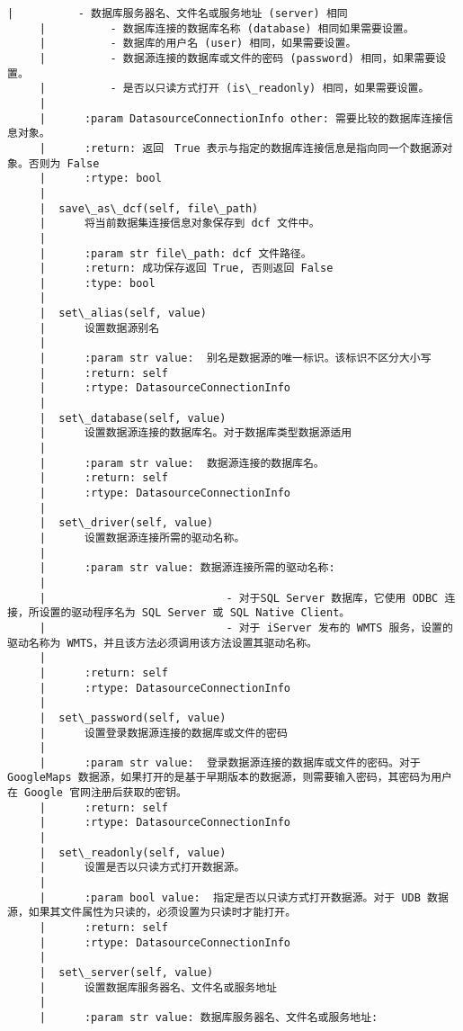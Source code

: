 \documentclass[11pt]{article}
\begin{document}
\begin{Verbatim}[commandchars=\\\{\}]
     |          - 数据库服务器名、文件名或服务地址 (server) 相同
     |          - 数据库连接的数据库名称 (database) 相同如果需要设置。
     |          - 数据库的用户名 (user) 相同，如果需要设置。
     |          - 数据源连接的数据库或文件的密码 (password) 相同，如果需要设置。
     |          - 是否以只读方式打开 (is\_readonly) 相同，如果需要设置。
     |      
     |      :param DatasourceConnectionInfo other: 需要比较的数据库连接信息对象。
     |      :return: 返回　True 表示与指定的数据库连接信息是指向同一个数据源对象。否则为 False
     |      :rtype: bool
     |  
     |  save\_as\_dcf(self, file\_path)
     |      将当前数据集连接信息对象保存到 dcf 文件中。
     |      
     |      :param str file\_path: dcf 文件路径。
     |      :return: 成功保存返回 True, 否则返回 False
     |      :type: bool
     |  
     |  set\_alias(self, value)
     |      设置数据源别名
     |      
     |      :param str value:  别名是数据源的唯一标识。该标识不区分大小写
     |      :return: self
     |      :rtype: DatasourceConnectionInfo
     |  
     |  set\_database(self, value)
     |      设置数据源连接的数据库名。对于数据库类型数据源适用
     |      
     |      :param str value:  数据源连接的数据库名。
     |      :return: self
     |      :rtype: DatasourceConnectionInfo
     |  
     |  set\_driver(self, value)
     |      设置数据源连接所需的驱动名称。
     |      
     |      :param str value: 数据源连接所需的驱动名称:
     |      
     |                            - 对于SQL Server 数据库，它使用 ODBC 连接，所设置的驱动程序名为 SQL Server 或 SQL Native Client。
     |                            - 对于 iServer 发布的 WMTS 服务，设置的驱动名称为 WMTS，并且该方法必须调用该方法设置其驱动名称。
     |      
     |      :return: self
     |      :rtype: DatasourceConnectionInfo
     |  
     |  set\_password(self, value)
     |      设置登录数据源连接的数据库或文件的密码
     |      
     |      :param str value:  登录数据源连接的数据库或文件的密码。对于 GoogleMaps 数据源，如果打开的是基于早期版本的数据源，则需要输入密码，其密码为用户在 Google 官网注册后获取的密钥。
     |      :return: self
     |      :rtype: DatasourceConnectionInfo
     |  
     |  set\_readonly(self, value)
     |      设置是否以只读方式打开数据源。
     |      
     |      :param bool value:  指定是否以只读方式打开数据源。对于 UDB 数据源，如果其文件属性为只读的，必须设置为只读时才能打开。
     |      :return: self
     |      :rtype: DatasourceConnectionInfo
     |  
     |  set\_server(self, value)
     |      设置数据库服务器名、文件名或服务地址
     |      
     |      :param str value: 数据库服务器名、文件名或服务地址:

\end{Verbatim}
\end{document}
